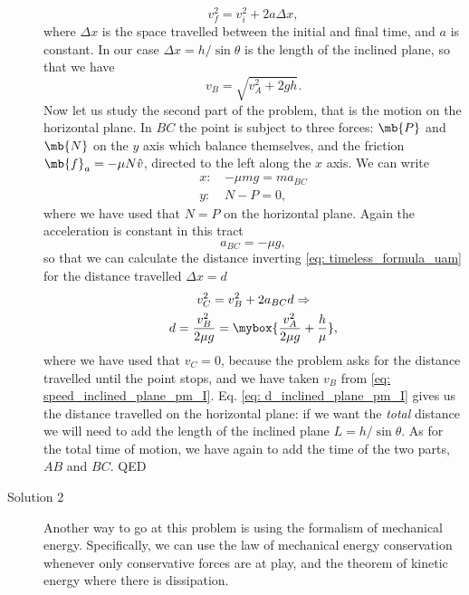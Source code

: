 \begin{description}
    \begin{equation}
        \label{eq: timeless_formula_uam}
        v_f^2 = v_i^2 + 2 a \Delta x,
    \end{equation}
    where $\Delta x$ is the space travelled between the initial and final time, and $a$ is constant. In our case $\Delta x = h/ \sin \theta$ is the length of the inclined plane, so that we have
    \begin{equation}
        \label{eq: speed_inclined_plane_pm_I}
        v_B = \sqrt{v_A^2 + 2 g h}.
    \end{equation}
    Now let us study the second part of the problem, that is the motion on the horizontal plane. In $BC$ the point is subject to three forces: $\mb{P}$ and $\mb{N}$ on the $y$ axis which balance themselves, and the friction $\mb{f}_a = -\mu N \hat{v}$, directed to the left along the $x$ axis. We can write
    \begin{align}
        x: \, & - \mu mg = m a_{BC} \\
        y: \, & N - P = 0,
    \end{align}
    where we have used that $N=P$ on the horizontal plane. Again the acceleration is constant in this tract
    \begin{equation}
        a_{BC} = - \mu g,
    \end{equation}
    so that we can calculate the distance inverting \cref{eq: timeless_formula_uam} for the distance travelled $\Delta x = d$
    \begin{gather}
        v_C^2 = v_B^2 + 2 a_{BC} d \Rightarrow \notag \\
        d = \frac{v_B^2}{2 \mu g} = \mybox{\frac{v_A^2}{2 \mu g} + \frac{h} {\mu}} \label{eq: d_inclined_plane_pm_I},
    \end{gather}
    where we have used that $v_C = 0$, because the problem asks for the distance travelled until the point stops, and we have taken $v_B$ from \cref{eq: speed_inclined_plane_pm_I}. Eq. \eqref{eq: d_inclined_plane_pm_I} gives us the distance travelled on the horizontal plane: if we want the \emph{total} distance we will need to add the length of the inclined plane $L = h/\sin\theta$. As for the total time of motion, we have again to add the time of the two parts, $AB$ and $BC$. 
    QED
    \item[Solution 2] Another way to go at this problem is using the formalism of mechanical energy. Specifically, we can use the law of mechanical energy conservation whenever only conservative forces are at play, and the theorem of kinetic energy where there is dissipation.

\end{description}
